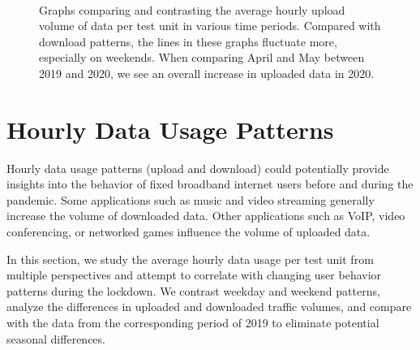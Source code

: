 \begin{figure}[th]
{    }
    \\
    \hspace{0.2cm}
        
    \caption{Graphs comparing and contrasting the average hourly upload volume of data per test unit in various time periods. Compared with download patterns, the lines in these graphs fluctuate more, especially on weekends. When comparing April and May between 2019 and 2020, we see an overall increase in uploaded data in 2020.}
  \label{fig:upload_data_per_user_hours_fig} 
\end{figure}


\section{Hourly Data Usage Patterns}
\label{sec:hourly-data-usage-patterns}

Hourly data usage patterns (upload and download) could potentially provide insights into the behavior of fixed broadband internet users before and during the pandemic. Some applications such as music and video streaming generally increase the volume of downloaded data. Other applications such as VoIP, video conferencing, or networked games influence the volume of uploaded data.

In this section, we study the average hourly data usage per test unit from multiple perspectives and attempt to correlate with changing user behavior patterns during the lockdown. We contrast weekday and weekend patterns, analyze the differences in uploaded and downloaded traffic volumes, and compare with the data from the corresponding period of 2019 to eliminate potential seasonal differences.


